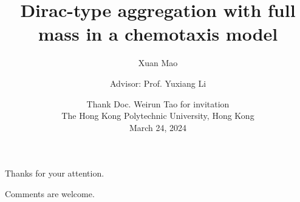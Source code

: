 \documentclass[10pt]{beamer}
\title{Dirac-type aggregation with full mass in a chemotaxis model}
\author{Xuan Mao\inst{1}\and
    Advisor: Prof. Yuxiang Li\inst{1}}
\institute{
    \inst{1}School of Mathematics, Southeast University, Nanjing
    }
\date{%
    Thank Doc. Weirun Tao for invitation\\
    The Hong Kong Polytechnic University, Hong Kong\\
    March 24, 2024
    }
\theoremstyle{remark}
\begin{document}
\begin{frame}
\end{frame}










\begin{frame}[standout]
    Thanks for your attention.
    
    Comments are welcome.
\end{frame} 
\end{document}

